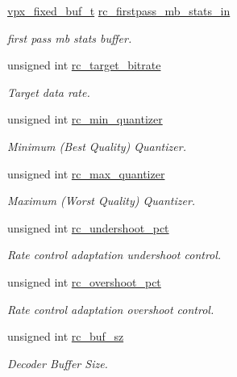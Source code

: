\begin{DoxyCompactItemize}
\hyperlink{group__encoder_ga21fab7dd28065f349c97165501223764}{vpx\+\_\+fixed\+\_\+buf\+\_\+t} \hyperlink{structvpx__codec__enc__cfg_a52dbc21bc28d6a2c7c70a43ad18461d8}{rc\+\_\+firstpass\+\_\+mb\+\_\+stats\+\_\+in}
\begin{DoxyCompactList}\small\item\em first pass mb stats buffer. \end{DoxyCompactList}\item 
unsigned int \hyperlink{structvpx__codec__enc__cfg_ab8339685175d66710f482706cc9f0aed}{rc\+\_\+target\+\_\+bitrate}
\begin{DoxyCompactList}\small\item\em Target data rate. \end{DoxyCompactList}\item 
unsigned int \hyperlink{structvpx__codec__enc__cfg_a1324600e3c63faaa7717e85cf6509dd9}{rc\+\_\+min\+\_\+quantizer}
\begin{DoxyCompactList}\small\item\em Minimum (Best Quality) Quantizer. \end{DoxyCompactList}\item 
unsigned int \hyperlink{structvpx__codec__enc__cfg_a8abdd985d317b720e142335887d737df}{rc\+\_\+max\+\_\+quantizer}
\begin{DoxyCompactList}\small\item\em Maximum (Worst Quality) Quantizer. \end{DoxyCompactList}\item 
unsigned int \hyperlink{structvpx__codec__enc__cfg_ad279fbb0a9fe9395340913161e28651a}{rc\+\_\+undershoot\+\_\+pct}
\begin{DoxyCompactList}\small\item\em Rate control adaptation undershoot control. \end{DoxyCompactList}\item 
unsigned int \hyperlink{structvpx__codec__enc__cfg_a4f2fbd015c1b1f395cc4a4b03d4ead5f}{rc\+\_\+overshoot\+\_\+pct}
\begin{DoxyCompactList}\small\item\em Rate control adaptation overshoot control. \end{DoxyCompactList}\item 
unsigned int \hyperlink{structvpx__codec__enc__cfg_a61866272bb588cd86d28834f420430f0}{rc\+\_\+buf\+\_\+sz}
\begin{DoxyCompactList}\small\item\em Decoder Buffer Size. \end{DoxyCompactList}\item 

\end{DoxyCompactItemize}
